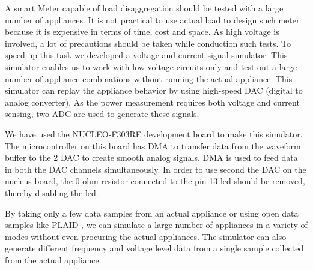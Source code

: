 A smart Meter capable of load disaggregation should be tested with a large number of appliances. It is not practical to use actual load to design such meter because it is expensive in terms of time, cost and space. As high voltage is involved, a lot of precautions should be taken while conduction such tests. To speed up this task we developed a voltage and current signal simulator. This simulator enables us to work with low voltage circuits only and test out a large number of appliance combinations without running the actual appliance. This simulator can replay the appliance behavior by using high-speed DAC (digital to analog converter).  As the power measurement requires both voltage and current sensing, two ADC are used to generate these signals.

We have used the NUCLEO-F303RE \cite{NUCLEOF303RESTM32Nucleo64} development board to make this simulator.
The microcontroller on this board has DMA to transfer data from the waveform buffer to the 2 DAC to create smooth analog signals. DMA is used to feed data in both the DAC channels simultaneously. In order to use second the DAC on the nucleus board, the 0-ohm resistor connected to the pin 13 led should be removed, thereby disabling the led.

By taking only a few data samples from an actual appliance or using open data samples like PLAID \cite{gaoPLAIDPublicDataset2014}, we can simulate a large number of appliances in a variety of modes without even procuring the actual appliances. The simulator can also generate different frequency and voltage level data from a single sample collected from the actual appliance.
